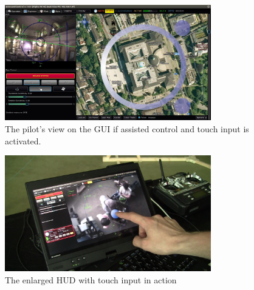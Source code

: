 \begin{figure}[H] %
	\begin{center}
		\includegraphics[width=0.8\textwidth]{qgc_manual_control}
		\caption{The pilot's view on the GUI if assisted  control and touch input is activated.}  
		\label{fig:qgc_manual_control}		
	\end{center}
\end{figure}

\begin{figure}[H] %
	\begin{center}
		\includegraphics[width=0.8\textwidth]{graphics/TouchInput}
		\caption{The enlarged HUD with touch input in action}  
		\label{fig:touchInput}		
	\end{center}
\end{figure}


